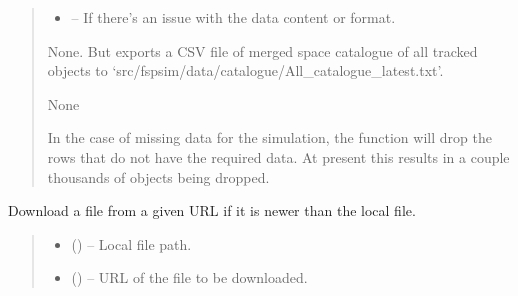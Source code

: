 \documentclass[letterpaper,10pt,english]{sphinxmanual}
\begin{document}
\begin{fulllineitems}
\begin{fulllineitems}
\begin{quote}
\begin{description}
\begin{itemize}
\item {} 
\sphinxAtStartPar
{} – If there’s an issue with the data content or format.

\end{itemize}

\sphinxAtStartPar
None. But exports a CSV file of merged space catalogue of all tracked objects to ‘src/fspsim/data/catalogue/All\_catalogue\_latest.txt’.

\sphinxAtStartPar
None

\sphinxAtStartPar
In the case of missing data for the simulation, the function will drop the rows that do not have the required data. At present this results in a couple thousands of objects being dropped.

\end{description}\end{quote}

\end{fulllineitems}


\begin{fulllineitems}
\label{\detokenize{fspsim.utils:fspsim.utils.SpaceCatalogue.SpaceCatalogue.DownloadJSRCatalogueIfNewer}}
\pysigstartsignatures
{}
\pysigstopsignatures
\sphinxAtStartPar
Download a file from a given URL if it is newer than the local file.
\begin{quote}\begin{description}
\begin{itemize}
\item {} 
\sphinxAtStartPar
{} () – Local file path.

\item {} 
\sphinxAtStartPar
{} () – URL of the file to be downloaded.

\end{itemize}


\end{description}
\end{quote}
\end{fulllineitems}
\end{fulllineitems}
\end{document}
